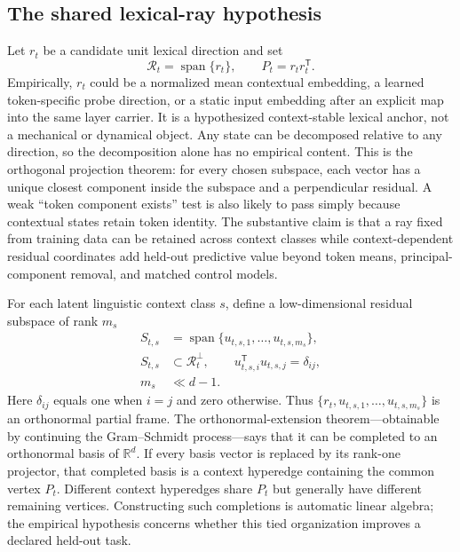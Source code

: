 \documentclass[
  aps,
  reprint,
  superscriptaddress,
  floatfix,
  nofootinbib,
  longbibliography
]{revtex4-2}
\newcommand{\R}{\mathbb{R}}
\newcommand{\T}{^{\mathsf{T}}}
\DeclareMathOperator{\spanop}{span}
\begin{document}
\subsection{The shared lexical-ray hypothesis}
\label{sec:reference-hypothesis}

Let $r_t$ be a candidate unit lexical direction and set
%
\begin{equation}
\label{eq:reference-direction}
\mathcal R_t=\spanop\{r_t\},
\qquad P_t=r_t r_t\T .
\end{equation}
%
Empirically, $r_t$ could be a normalized mean contextual embedding, a learned
token-specific probe direction, or a static input embedding after an explicit
map into the same layer carrier.  It is a hypothesized context-stable lexical
anchor, not a mechanical or dynamical object.
Any state can be decomposed relative to any direction, so the decomposition
alone has no empirical content.  This is the orthogonal projection theorem:
for every chosen subspace, each vector has a unique closest component inside
the subspace and a perpendicular residual.  A weak ``token component exists''
test is also likely to pass simply because contextual states retain token
identity.  The substantive claim is that a ray fixed from training data can be
retained across context classes while context-dependent residual coordinates
add held-out predictive value beyond token means, principal-component removal,
and matched control models.

For each latent linguistic context class $s$, define a low-dimensional residual subspace
of rank $m_s$
%
\begin{equation}
\label{eq:sense-subspace}
\begin{aligned}
S_{t,s}&=\spanop\{u_{t,s,1},\dots,u_{t,s,m_s}\},\\
S_{t,s}&\subset\mathcal R_t^\perp,
\qquad u_{t,s,i}\T u_{t,s,j}=\delta_{ij},\\
m_s&\ll d-1 .
\end{aligned}
\end{equation}
%
Here $\delta_{ij}$ equals one when $i=j$ and zero otherwise.  Thus
$\{r_t,u_{t,s,1},\ldots,u_{t,s,m_s}\}$ is an orthonormal partial frame.  The
orthonormal-extension theorem---obtainable by continuing the Gram--Schmidt
process---says that it can be completed to an orthonormal basis of $\R^d$.
If every basis vector is replaced by its rank-one projector, that completed
basis is a context hyperedge containing the common vertex $P_t$.  Different
context hyperedges share $P_t$ but generally have different remaining
vertices.  Constructing such completions is automatic linear algebra; the
empirical hypothesis concerns whether this tied organization improves a
declared held-out task.
\end{document}

